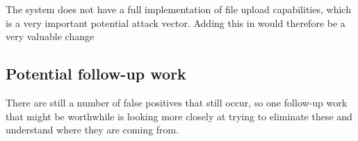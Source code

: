 \documentclass[11pt]{article}
\begin{document}
The system does not have a full implementation of file upload capabilities, which is a very important potential attack vector.
Adding this in would therefore be a very valuable change

\subsection*{Potential follow-up work}

There are still a number of false positives that still occur, so one follow-up work that might be worthwhile is looking more closely at trying to eliminate these and understand where they are coming from.
\end{document}
